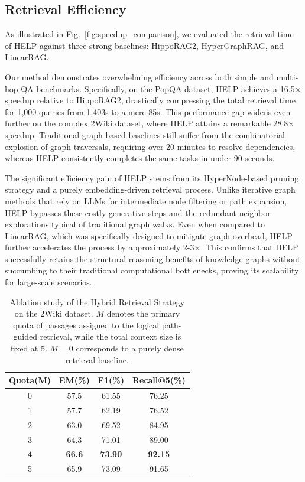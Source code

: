 \subsection{Retrieval Efficiency}

As illustrated in Fig.~\ref{fig:speedup_comparison}, we evaluated the retrieval time of HELP against three strong baselines: HippoRAG2, HyperGraphRAG, and LinearRAG.

Our method demonstrates overwhelming efficiency across both simple and multi-hop QA benchmarks. Specifically, on the PopQA dataset, HELP achieves a 16.5$\times$ speedup relative to HippoRAG2, drastically compressing the total retrieval time for 1,000 queries from 1,403s to a mere 85s. This performance gap widens even further on the complex 2Wiki dataset, where HELP attains a remarkable 28.8$\times$ speedup. Traditional graph-based baselines still suffer from the combinatorial explosion of graph traversals, requiring over 20 minutes to resolve dependencies, whereas HELP consistently completes the same tasks in under 90 seconds.

The significant efficiency gain of HELP stems from its HyperNode-based pruning strategy and a purely embedding-driven retrieval process. Unlike iterative graph methods that rely on LLMs for intermediate node filtering or path expansion, HELP bypasses these costly generative steps and the redundant neighbor explorations typical of traditional graph walks. Even when compared to LinearRAG, which was specifically designed to mitigate graph overhead, HELP further accelerates the process by approximately 2-3$\times$. This confirms that HELP successfully retains the structural reasoning benefits of knowledge graphs without succumbing to their traditional computational bottlenecks, proving its scalability for large-scale scenarios.


\begin{table}[t!]
\centering
\caption{Ablation study of the Hybrid Retrieval Strategy on the 2Wiki dataset. 
$M$ denotes the primary quota of passages assigned to the logical path-guided retrieval, while the total context size is fixed at 5. $M=0$ corresponds to a purely dense retrieval baseline.
}
\vspace{-5pt}
\label{tab:hybrid_ablation}
\small
\setlength{\tabcolsep}{12pt} %
\begin{tabular}{c c c c}
\toprule
\textbf{Quota(M)} & \textbf{EM(\%)} & \textbf{F1(\%)} &  \textbf{Recall@5(\%)} \\
\midrule
0 & 57.5 & 61.55 & 76.25 \\
1 & 57.7 & 62.19 & 76.52 \\
2 & 63.0 & 69.52 & 84.95 \\
3 & 64.3 & 71.01 & 89.00 \\
\rowcolor{blue!10} \textbf{4} & \textbf{66.6} & \textbf{73.90} & \textbf{92.15} \\
5 & 65.9 & 73.09 & 91.65 \\
\bottomrule
\end{tabular}
\vspace{-20pt}
\end{table}

